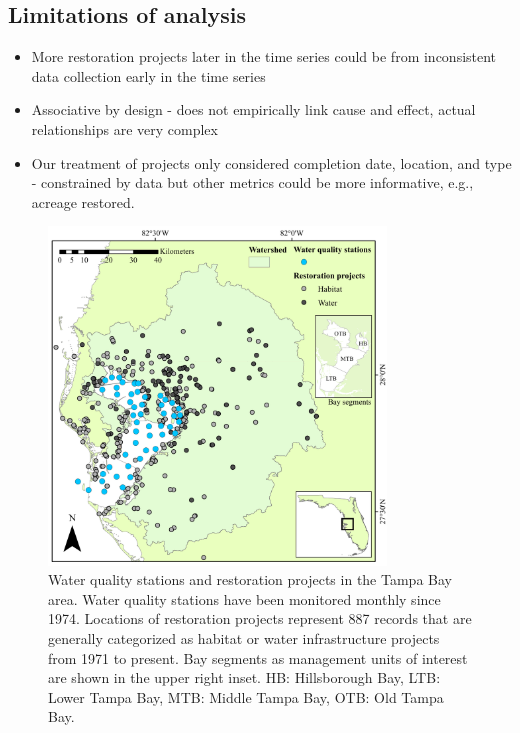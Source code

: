 \documentclass[]{article}
\begin{document}
\hypertarget{limitations-of-analysis}{%
\subsection{Limitations of analysis}\label{limitations-of-analysis}}

\begin{itemize}
\item
  More restoration projects later in the time series could be from
  inconsistent data collection early in the time series
\item
  Associative by design - does not empirically link cause and effect,
  actual relationships are very complex
\item
  Our treatment of projects only considered completion date, location,
  and type - constrained by data but other metrics could be more
  informative, e.g., acreage restored.
\end{itemize}

\clearpage

\begin{figure}
\centerline{\includegraphics[width = 0.8\textwidth]{figs/tbrest_map.pdf}}
\caption{Water quality stations and restoration projects in the Tampa Bay area.  Water quality stations have been monitored monthly since 1974.  Locations of restoration projects represent 887 records that are generally categorized as habitat or water infrastructure projects from 1971 to present.  Bay segments as management units of interest are shown in the upper right inset. HB: Hillsborough Bay, LTB: Lower Tampa Bay, MTB: Middle Tampa Bay, OTB: Old Tampa Bay.}
\label{fig:map}
\end{figure}
\end{document}

